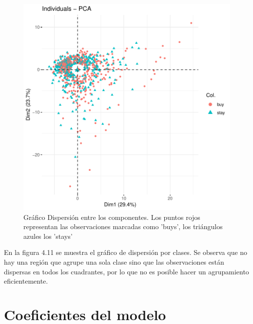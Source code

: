 \documentclass[a4paper,12pt]{Latex/Classes/PhDthesisPSnPDF}
\begin{document}
\begin{figure}[H]
\centering
\includegraphics{main-018}
\caption{Gráfico Dispersión entre los componentes. Los puntos rojos representan las observaciones marcadas como 'buys', los triángulos azules los 'stays'}
\end{figure}

En la figura 4.11 se muestra el gráfico de dispersión por clases. Se observa que no hay una región que agrupe una sola clase sino que las observaciones están dispersas en todos los cuadrantes, por lo que no es posible hacer un agrupamiento eficientemente.



\newpage

\section{Coeficientes del modelo}
\end{document}
